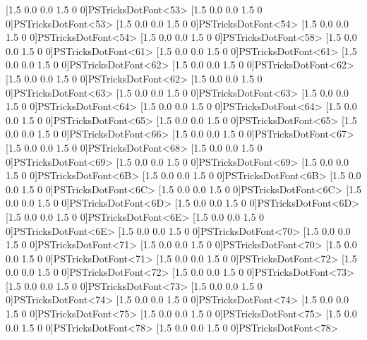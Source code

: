  [1.5 0.0 0.0 1.5 0 0]{PSTricksDotFont}{<53>}
  [1.5 0.0 0.0 1.5 0 0]{PSTricksDotFont}{<53>}
  [1.5 0.0 0.0 1.5 0 0]{PSTricksDotFont}{<54>}
  [1.5 0.0 0.0 1.5 0 0]{PSTricksDotFont}{<54>}
  [1.5 0.0 0.0 1.5 0 0]{PSTricksDotFont}{<58>}
%
  \newpsfontdot{+}[1.5 0.0 0.0 1.5 0 0]{PSTricksDotFont}{<61>}
  [1.5 0.0 0.0 1.5 0 0]{PSTricksDotFont}{<61>}
  [1.5 0.0 0.0 1.5 0 0]{PSTricksDotFont}{<62>}
  [1.5 0.0 0.0 1.5 0 0]{PSTricksDotFont}{<62>}
  \newpsfontdot{*}[1.5 0.0 0.0 1.5 0 0]{PSTricksDotFont}{<62>}
  [1.5 0.0 0.0 1.5 0 0]{PSTricksDotFont}{<63>}
  [1.5 0.0 0.0 1.5 0 0]{PSTricksDotFont}{<63>}
  [1.5 0.0 0.0 1.5 0 0]{PSTricksDotFont}{<64>}
  [1.5 0.0 0.0 1.5 0 0]{PSTricksDotFont}{<64>}
  [1.5 0.0 0.0 1.5 0 0]{PSTricksDotFont}{<65>}
  [1.5 0.0 0.0 1.5 0 0]{PSTricksDotFont}{<65>}
  [1.5 0.0 0.0 1.5 0 0]{PSTricksDotFont}{<66>}
  [1.5 0.0 0.0 1.5 0 0]{PSTricksDotFont}{<67>}
  [1.5 0.0 0.0 1.5 0 0]{PSTricksDotFont}{<68>}
  [1.5 0.0 0.0 1.5 0 0]{PSTricksDotFont}{<69>}
  \newpsfontdot{|}[1.5 0.0 0.0 1.5 0 0]{PSTricksDotFont}{<69>}
  [1.5 0.0 0.0 1.5 0 0]{PSTricksDotFont}{<6B>}
  [1.5 0.0 0.0 1.5 0 0]{PSTricksDotFont}{<6B>}
  [1.5 0.0 0.0 1.5 0 0]{PSTricksDotFont}{<6C>}
  [1.5 0.0 0.0 1.5 0 0]{PSTricksDotFont}{<6C>}
  [1.5 0.0 0.0 1.5 0 0]{PSTricksDotFont}{<6D>}
  [1.5 0.0 0.0 1.5 0 0]{PSTricksDotFont}{<6D>}
  [1.5 0.0 0.0 1.5 0 0]{PSTricksDotFont}{<6E>}
  [1.5 0.0 0.0 1.5 0 0]{PSTricksDotFont}{<6E>}
%
  [1.5 0.0 0.0 1.5 0 0]{PSTricksDotFont}{<70>}
  [1.5 0.0 0.0 1.5 0 0]{PSTricksDotFont}{<71>}
  [1.5 0.0 0.0 1.5 0 0]{PSTricksDotFont}{<70>}
  [1.5 0.0 0.0 1.5 0 0]{PSTricksDotFont}{<71>}
  [1.5 0.0 0.0 1.5 0 0]{PSTricksDotFont}{<72>}
  [1.5 0.0 0.0 1.5 0 0]{PSTricksDotFont}{<72>}
  [1.5 0.0 0.0 1.5 0 0]{PSTricksDotFont}{<73>}
  [1.5 0.0 0.0 1.5 0 0]{PSTricksDotFont}{<73>}
  [1.5 0.0 0.0 1.5 0 0]{PSTricksDotFont}{<74>}
  [1.5 0.0 0.0 1.5 0 0]{PSTricksDotFont}{<74>}
  [1.5 0.0 0.0 1.5 0 0]{PSTricksDotFont}{<75>}
  [1.5 0.0 0.0 1.5 0 0]{PSTricksDotFont}{<75>}
  [1.5 0.0 0.0 1.5 0 0]{PSTricksDotFont}{<78>}
  [1.5 0.0 0.0 1.5 0 0]{PSTricksDotFont}{<78>}
%
\endinput
